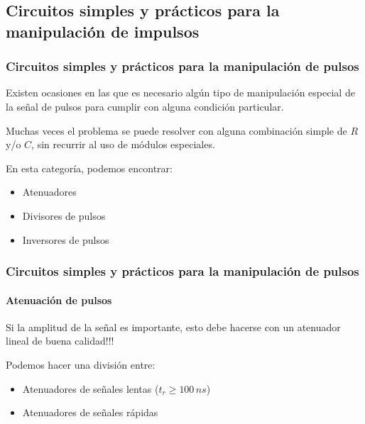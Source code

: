\documentclass{beamer}
\begin{document}
\begin{frame}
  \begin{center}
    \Huge{\color{blue}{Atenuación de señales}}
  \end{center}
\end{frame}

\subsection{Circuitos simples y prácticos para la manipulación de
impulsos}

\begin{frame}
\frametitle{Circuitos simples y prácticos para la manipulación de
pulsos}
Existen ocasiones en las que es necesario algún tipo de manipulación especial
de la señal de pulsos para cumplir con alguna condición particular.

Muchas veces el problema se puede resolver con alguna combinación simple de $R$
y/o $C$, sin recurrir al uso de módulos especiales.

En esta categoría, podemos encontrar:
\begin{itemize}
\item Atenuadores
\item Divisores de pulsos
\item Inversores de pulsos
\end{itemize}
\end{frame}

\begin{frame}
\frametitle{Circuitos simples y prácticos para la manipulación de
pulsos}
\framesubtitle{{\color{blue}Atenuación de pulsos}}
\begin{alertblock}{}
Si la amplitud de la señal es importante, esto debe hacerse con un atenuador
lineal de buena calidad!!!
\end{alertblock}

Podemos hacer una división entre:
\begin{itemize}
\item Atenuadores de señales \alert{lentas} ($t_r \geq 100\,ns$)
\item Atenuadores de señales \alert{rápidas}
\end{itemize}
\end{frame}
\end{document}
